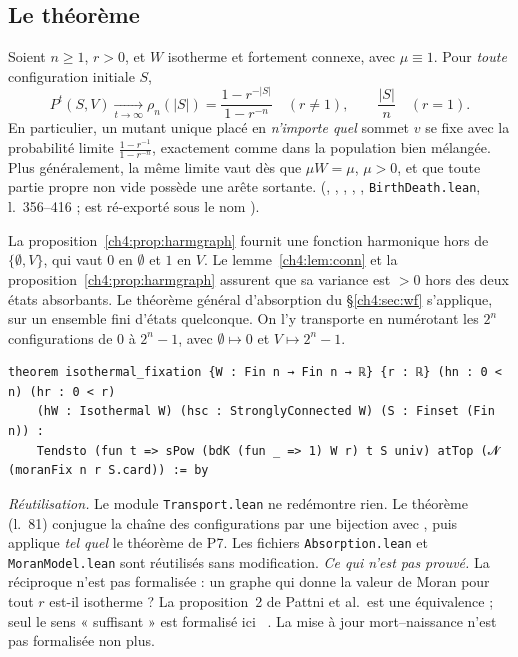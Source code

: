 \subsection{Le théorème}
\begin{theorem}\label{ch4:thm:iso}
Soient $n\ge1$, $r>0$, et $W$ isotherme et fortement connexe, avec $\mu\equiv1$. Pour \emph{toute} configuration
initiale $S$,
\[
P^t(S,V)\xrightarrow[t\to\infty]{}\rho_n(|S|)=\frac{1-r^{-|S|}}{1-r^{-n}}\quad(r\ne1),\qquad\frac{|S|}{n}\quad(r=1).
\]
En particulier, un mutant unique placé en \emph{n'importe quel} sommet $v$ se fixe avec la probabilité limite
$\frac{1-r^{-1}}{1-r^{-n}}$, exactement comme dans la population bien mélangée. Plus généralement, la même limite
vaut dès que $\mu W=\mu$, $\mu>0$, et que toute partie propre non vide possède une arête sortante.
\tierA{} (, , ,
, , \texttt{BirthDeath.lean}, l.~356--416 ;  est ré-exporté sous le nom ).
\end{theorem}

\begin{humanproof}
La proposition~\ref{ch4:prop:harmgraph} fournit une fonction harmonique hors de $\{\emptyset,V\}$, qui vaut $0$ en
$\emptyset$ et $1$ en $V$. Le lemme~\ref{ch4:lem:conn} et la proposition~\ref{ch4:prop:harmgraph} assurent que sa
variance est $>0$ hors des deux états absorbants. Le théorème général d'absorption du §\ref{ch4:sec:wf}
s'applique, sur un ensemble fini d'états quelconque. On l'y transporte en numérotant les $2^n$ configurations de
$0$ à $2^n-1$, avec $\emptyset\mapsto0$ et $V\mapsto2^n-1$.
\end{humanproof}

\begin{leanbox}
\begin{lstlisting}[language=Lean]
theorem isothermal_fixation {W : Fin n → Fin n → ℝ} {r : ℝ} (hn : 0 < n) (hr : 0 < r)
    (hW : Isothermal W) (hsc : StronglyConnected W) (S : Finset (Fin n)) :
    Tendsto (fun t => sPow (bdK (fun _ => 1) W r) t S univ) atTop (𝓝 (moranFix n r S.card)) := by
\end{lstlisting}
\emph{Réutilisation.} Le module \texttt{Transport.lean} ne redémontre rien. Le théorème
 (l.~81) conjugue la chaîne des configurations par une bijection avec
, puis applique \emph{tel quel} le théorème  de P7. Les fichiers
\texttt{Absorption.lean} et \texttt{MoranModel.lean} sont réutilisés sans modification.
\emph{Ce qui n'est pas prouvé.} La réciproque n'est pas formalisée : un graphe qui donne la valeur de Moran pour
tout $r$ est-il isotherme ? La proposition~2 de Pattni et al.\ est une équivalence ; seul le sens « suffisant »
est formalisé ici \tierL{}~\cite{ch4:PBRS}. La mise à jour mort--naissance n'est pas formalisée non plus.
\end{leanbox}

